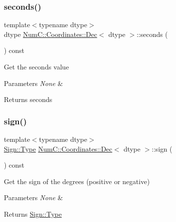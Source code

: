 \subsubsection{\texorpdfstring{seconds()}{seconds()}}
{\footnotesize\ttfamily template$<$typename dtype$>$ \\
dtype \mbox{\hyperlink{class_num_c_1_1_coordinates_1_1_dec}{Num\+C\+::\+Coordinates\+::\+Dec}}$<$ dtype $>$\+::seconds (\begin{DoxyParamCaption}{ }\end{DoxyParamCaption}) const\hspace{0.3cm}{\ttfamily [inline]}}

Get the seconds value


\begin{DoxyParams}{Parameters}
{\em None} & \\
\hline
\end{DoxyParams}
\begin{DoxyReturn}{Returns}
seconds 
\end{DoxyReturn}
\mbox{\label{class_num_c_1_1_coordinates_1_1_dec_ae2ad87383ff4db3c9b1fd1aa90262be5}} 
\subsubsection{\texorpdfstring{sign()}{sign()}}
{\footnotesize\ttfamily template$<$typename dtype$>$ \\
\mbox{\hyperlink{struct_num_c_1_1_coordinates_1_1_sign_a915938d7fce678936d8728ca14a70e22}{Sign\+::\+Type}} \mbox{\hyperlink{class_num_c_1_1_coordinates_1_1_dec}{Num\+C\+::\+Coordinates\+::\+Dec}}$<$ dtype $>$\+::sign (\begin{DoxyParamCaption}{ }\end{DoxyParamCaption}) const\hspace{0.3cm}{\ttfamily [inline]}}

Get the sign of the degrees (positive or negative)


\begin{DoxyParams}{Parameters}
{\em None} & \\
\hline
\end{DoxyParams}
\begin{DoxyReturn}{Returns}
\mbox{\hyperlink{struct_num_c_1_1_coordinates_1_1_sign_a915938d7fce678936d8728ca14a70e22}{Sign\+::\+Type}} 
\end{DoxyReturn}
\mbox{\label{class_num_c_1_1_coordinates_1_1_dec_a0116aa3de05240cdd9730462b1baac1e}} 
